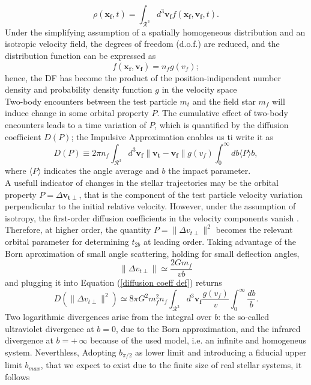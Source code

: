 \documentclass[12pt,twoside,openany]{book}
\begin{document}
\begin{equation}
\rho(\mathbf{x_f},t)=\int_{\mathcal{R}^3}d^3\mathbf{v_f}f(\mathbf{x_f},\mathbf{v_f},t).
\end{equation}
Under the simplifying assumption of a spatially homogeneous distribution and an isotropic velocity field, the degrees of freedom (d.o.f.) are reduced, and the distribution function can be expressed as
\begin{equation}
    f(\mathbf{x_f},\mathbf{v_f})=n_fg(v_f);
\end{equation}
hence, the DF has become the product of the position-indipendent number density and probability density function $g$ in the velocity space\\Two-body encounters between the test particle $m_t$ and the field star $m_f$ will induce change in some orbital property $P$. The cumulative effect of two-body encounters leads to a time variation of $P$, which is quantified by the diffusion coefficient $D(P)$; the Impulsive Approximation enables us ti write it as
\begin{equation}\label{diffusion coeff def}
    D(P)\equiv 2\pi n_f\int_{\mathcal{R}^3} d^3\mathbf{v_f}\|\mathbf{v_t}-\mathbf{v_f}\|g(v_f)\int_0^\infty db\langle P\rangle b,
 \end{equation}
where $\langle P\rangle$ indicates the angle average and $b$ the impact parameter.\\A usefull indicator of changes in the stellar trajectories may be the orbital property $P=\Delta\mathbf{v_{t\perp}}$, that is the component of the test particle velocity variation perpendicular to the initial relative velocity. However, under the assumption of isotropy, the first-order diffusion coefficients in the velocity components vanish \parencite{binney_2011}. Therefore, at higher order, the quantity $P=\|\Delta v_{t\perp} \|^2$ becomes the relevant orbital parameter for determining $t_{2b}$ at leading order. Taking advantage of the Born aproximation of small angle scattering, holding for small deflection angles, 
\begin{equation}
    \|\Delta v_{t\perp} \|\simeq \frac{2Gm_f}{vb}
\end{equation}
and plugging it into Equation (\ref{diffusion coeff def}) returns
\begin{equation}
    D(\|\Delta v_{t\perp} \|^2)\simeq 8\pi G^2m_f^2n_f\int_{\mathcal{R}^3}d^3\mathbf{v_f}\frac{g(v_f)}{v}\int_0^\infty \frac{db}{b}.
\end{equation}
Two logarithmic divergences arise from the integral over $b$: the so-called ultraviolet divergence at $b=0$, due to the Born approximation, and the infrared divergence at $b=+\,\infty$ because of the used model, i.e. an infinite and homogeneus system. Neverthless, Adopting $b_{\pi/2}$ as lower limit and introducing a fiducial upper limit $b_{max}$, that we expect to exist due to the finite size of real stellar systems, it follows
\end{document}
